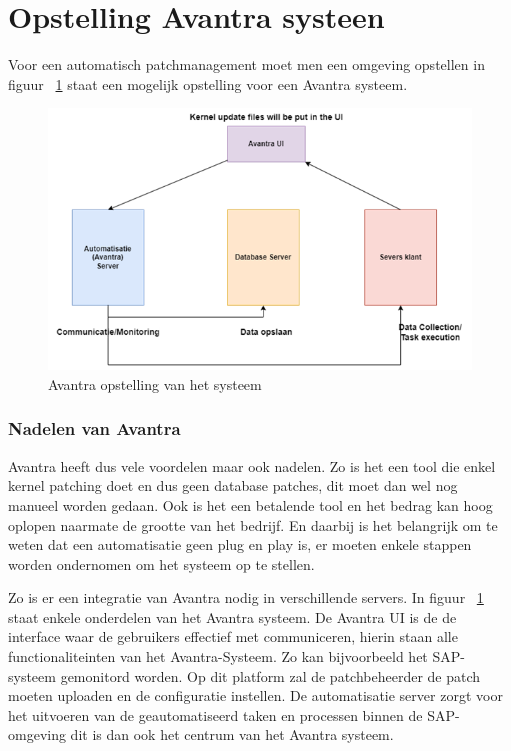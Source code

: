 \section{Opstelling Avantra systeen}
Voor een automatisch patchmanagement moet men een omgeving opstellen in figuur ~\ref{fig:avantra4} staat een mogelijk opstelling voor een Avantra systeem. 
\begin{figure}[htbp]
    \centering
    \includegraphics[width=\textwidth]{avantra4.png}
    \caption{Avantra opstelling van het systeem}
     \label{fig:avantra4}
\end{figure}

\subsubsection{Nadelen van Avantra}
Avantra heeft dus vele voordelen maar ook nadelen. Zo is het een tool die enkel kernel patching doet en dus geen database patches, dit moet dan wel nog manueel worden gedaan. Ook is het een betalende tool en het bedrag kan hoog oplopen naarmate de grootte van het bedrijf.
En daarbij is het belangrijk om te weten dat een automatisatie geen plug en play is, er moeten enkele stappen worden ondernomen om het systeem op te stellen.

Zo is er een integratie van Avantra nodig in verschillende servers. In figuur ~\ref{fig:avantra4} staat enkele onderdelen van het Avantra systeem. De Avantra UI is de de interface waar de gebruikers effectief met communiceren, hierin staan alle functionaliteinten van het Avantra-Systeem. Zo kan bijvoorbeeld het SAP-systeem gemonitord worden. Op
dit platform zal de patchbeheerder de patch moeten uploaden en de configuratie instellen. De automatisatie server zorgt voor het uitvoeren van de geautomatiseerd taken en processen binnen de SAP-omgeving dit is dan ook het centrum van het Avantra systeem.

